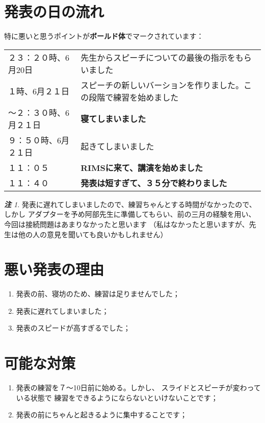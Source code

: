 \documentclass[12pt]{article} %
\theoremstyle{remark}
\newtheorem*{remark*}{\textbf{注}}
\begin{document}
\section{発表の日の流れ}
特に悪いと思うポイントが\textbf{ボールド体}でマークされています：
\begin{center}
	\begin{tabular}[]{lp{}}
		２３：２０時、6月20日&先生からスピーチについての最後の指示をもらいました\\
		１時、6月２１日&スピーチの新しいバーションを作りました。この段階で練習を始めました\\
		〜２：３０時、6月２１日&{\bf 寝てしまいました}\\
		９：５０時、6月２１日&起きてしまいました\\
		１１：０５&{\bf RIMSに来て、講演を始めました}\\
		１１：４０&{\bf 発表は短すぎて、３５分で終わりました}\\
	\end{tabular}
	\begin{remark*}
		発表に遅れてしまいましたので、練習ちゃんとする時間がなかったので、しかし
		アダプターを予め阿部先生に準備してもらい、前の三月の経験を用い、今回は接続問題はあまりなかったと思います
		（私はなかったと思いますが、先生は他の人の意見を聞いても良いかもしれません）
	\end{remark*}
\end{center}
\section{悪い発表の理由}
\begin{enumerate}
	\item 発表の前、寝坊のため、練習は足りませんでした；
	\item 発表に遅れてしまいました；
	\item 発表のスピードが高すぎるでした；
\end{enumerate}
\section{可能な対策}
\begin{enumerate}
	\item 発表の練習を７〜10日前に始める。しかし、
		スライドとスピーチが変わっている状態で
		練習をできるようにならないといけないことです；
	\item 発表の前にちゃんと起きるように集中することです；
\end{enumerate}
\end{document}
